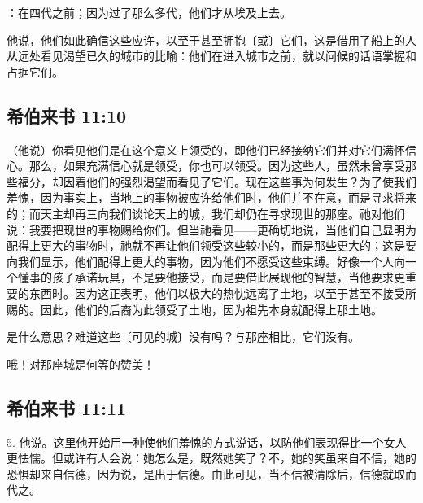 ：在四代之前；因为过了那么多代，他们才从埃及上去。\par

他说，他们如此确信这些应许，以至于甚至拥抱〔或〕它们，这是借用了船上的人从远处看见渴望已久的城市的比喻：他们在进入城市之前，就以问候的话语掌握和占据它们。\par


\subsection{希伯来书 11:10}

（他说）你看见他们是在这个意义上领受的，即他们已经接纳它们并对它们满怀信心。那么，如果充满信心就是领受，你也可以领受。因为这些人，虽然未曾享受那些福分，却因着他们的强烈渴望而看见了它们。现在这些事为何发生？为了使我们羞愧，因为事实上，当地上的事物被应许给他们时，他们并不在意，而是寻求将来的；而天主却再三向我们谈论天上的城，我们却仍在寻求现世的那座。祂对他们说：我要把现世的事物赐给你们。但当祂看见——更确切地说，当他们自己显明为配得上更大的事物时，祂就不再让他们领受这些较小的，而是那些更大的；这是要向我们显示，他们配得上更大的事物，因为他们不愿受这些束缚。好像一个人向一个懂事的孩子承诺玩具，不是要他接受，而是要借此展现他的智慧，当他要求更重要的东西时。因为这正表明，他们以极大的热忱远离了土地，以至于甚至不接受所赐的。因此，他们的后裔为此领受了土地，因为祖先本身就配得上那土地。\par

是什么意思？难道这些〔可见的城〕没有吗？与那座相比，它们没有。\par

哦！对那座城是何等的赞美！\par


\subsection{希伯来书 11:11}

5. 他说。这里他开始用一种使他们羞愧的方式说话，以防他们表现得比一个女人更怯懦。但或许有人会说：她怎么是，既然她笑了？不，她的笑虽来自不信，她的恐惧却来自信德，因为说，是出于信德。由此可见，当不信被清除后，信德就取而代之。\par

